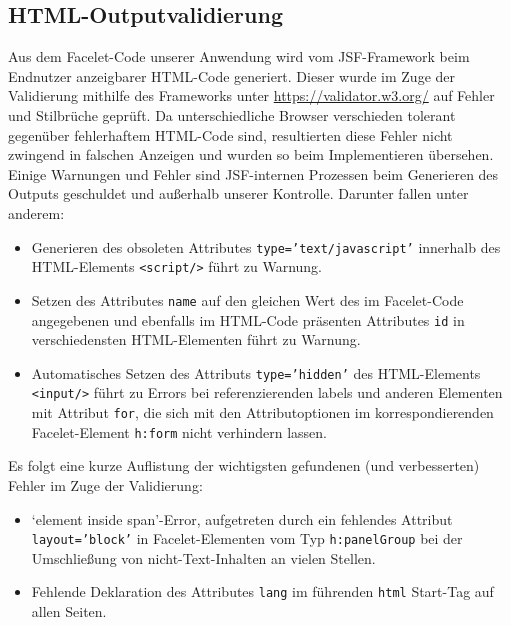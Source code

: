 \documentclass{article}
\begin{document}
\subsection{HTML-Outputvalidierung}
Aus dem Facelet-Code unserer Anwendung wird vom JSF-Framework beim Endnutzer anzeigbarer HTML-Code generiert. Dieser wurde im Zuge der Validierung mithilfe des Frameworks unter  \url{https://validator.w3.org/} auf Fehler und Stilbrüche geprüft. Da unterschiedliche Browser verschieden tolerant gegenüber fehlerhaftem HTML-Code sind, resultierten diese Fehler nicht zwingend in falschen Anzeigen und wurden so beim Implementieren übersehen. Einige Warnungen und Fehler sind JSF-internen Prozessen beim Generieren des Outputs geschuldet und außerhalb unserer Kontrolle. Darunter fallen unter anderem:
\begin{itemize}
\item Generieren des obsoleten Attributes \texttt{type='text/javascript'} innerhalb des HTML-Elements \texttt{<script/>} führt zu Warnung.
\item Setzen des Attributes \texttt{name} auf den gleichen Wert des im Facelet-Code angegebenen und ebenfalls im HTML-Code präsenten Attributes \texttt{id} in verschiedensten HTML-Elementen führt zu Warnung.
\item Automatisches Setzen des Attributs \texttt{type='hidden'} des HTML-Elements \texttt{<input/>} führt zu Errors bei referenzierenden labels und anderen Elementen mit Attribut \texttt{for}, die sich mit den Attributoptionen im korrespondierenden Facelet-Element \texttt{h:form} nicht verhindern lassen.
\end{itemize}
Es folgt eine kurze Auflistung der wichtigsten gefundenen (und verbesserten) Fehler im Zuge der Validierung:
\begin{itemize}
\item `element inside span'-Error, aufgetreten durch ein fehlendes Attribut \texttt{layout='block'} in Facelet-Elementen vom Typ \texttt{h:panelGroup} bei der Umschließung von nicht-Text-Inhalten an vielen Stellen.
\item Fehlende Deklaration des Attributes \texttt{lang} im führenden \texttt{html} Start-Tag auf allen Seiten.
\end{itemize}
\end{document}
